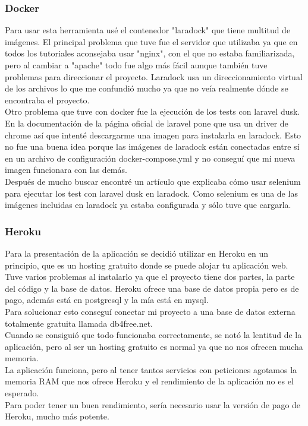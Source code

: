 \subsubsection{Docker}
Para usar esta herramienta usé el contenedor "laradock" que tiene multitud de imágenes. El principal problema que tuve fue el servidor que utilizaba ya que en todos los tutoriales aconsejaba usar "nginx", con el que no estaba familiarizada, pero al cambiar a "apache" todo fue algo más fácil aunque también tuve problemas para direccionar el proyecto.
Laradock usa un direccionamiento virtual de los archivos lo que me confundió mucho ya que no veía realmente dónde se encontraba el proyecto.\\
Otro problema que tuve con docker fue la ejecución de los tests con laravel dusk. En la documentación de la página oficial de laravel pone que usa un driver de chrome así que intenté descargarme una imagen para instalarla en laradock. Esto no fue una buena idea porque las imágenes de laradock están conectadas entre sí en un archivo de configuración docker-compose.yml y no conseguí que mi nueva imagen funcionara con las demás.\\
Después de mucho buscar encontré un artículo \cite{selenium} que explicaba cómo usar selenium para ejecutar los test con laravel dusk en laradock. Como selenium es una de las imágenes incluidas en laradock ya estaba configurada y sólo tuve que cargarla.
\subsubsection{Heroku}
Para la presentación de la aplicación se decidió utilizar en Heroku en un principio, que es un hosting gratuito donde se puede alojar tu aplicación web. Tuve varios problemas al instalarlo ya que el proyecto tiene dos partes, la parte del código y la base de datos. Heroku ofrece una base de datos propia pero es de pago, además está en postgresql y la mía está en mysql.\\
Para solucionar esto conseguí conectar mi proyecto a una base de datos externa totalmente gratuita llamada db4free.net.\\
Cuando se consiguió que todo funcionaba correctamente, se notó la lentitud de la aplicación, pero al ser un hosting gratuito
es normal ya que no nos ofrecen mucha memoria.\\
La aplicación funciona, pero al tener tantos servicios con peticiones agotamos la memoria RAM que nos ofrece Heroku y el rendimiento de la aplicación no es el esperado.\\
Para poder tener un buen rendimiento, sería necesario usar la versión de pago de Heroku, mucho más potente.
